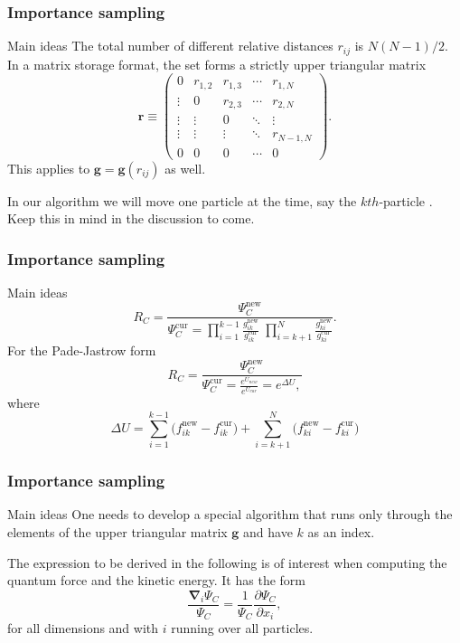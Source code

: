 \documentclass{beamer}
\begin{document}
\begin{frame}
\frametitle{Importance sampling}

\begin{block}{Main ideas }
The total number of different relative distances $r_{ij}$ is $N(N-1)/2$. In a matrix storage format, the set forms a strictly upper triangular matrix
\[
 \mathbf{r} \equiv \begin{pmatrix}
  0 & r_{1,2} & r_{1,3} & \cdots & r_{1,N} \\
  \vdots & 0       & r_{2,3} & \cdots & r_{2,N} \\
  \vdots & \vdots  & 0  & \ddots & \vdots  \\
  \vdots & \vdots  & \vdots  & \ddots  & r_{N-1,N} \\
  0 & 0  & 0  & \cdots  & 0
 \end{pmatrix}.
\]
This applies to  $\mathbf{g} = \mathbf{g}(r_{ij})$ as well. 

In our algorithm we will move one particle  at the time, say the $kth$-particle . Keep this in mind in the discussion to come.


\end{block}
\end{frame}

\begin{frame}
\frametitle{Importance sampling}

\begin{block}{Main ideas }
\[
R_{C} = \frac{\Psi_{C}^\mathrm{new}}{\Psi_{C}^\mathrm{cur} =
\prod_{i=1}^{k-1}\frac{g_{ik}^\mathrm{new}}{g_{ik}^\mathrm{cur}}\;
\prod_{i=k+1}^{N}\frac{g_{ki}^\mathrm{new}}{g_{ki}^\mathrm{cur}}}.
\]
For the Pade-Jastrow form
\[
 R_{C} = \frac{\Psi_{C}^\mathrm{new}}{\Psi_{C}^\mathrm{cur} = \frac{e^{U_{new}}}{e^{U_{cur}}} = e^{\Delta U},}
\]
where
\[
\Delta U =
\sum_{i=1}^{k-1}\big(f_{ik}^\mathrm{new}-f_{ik}^\mathrm{cur}\big)
+
\sum_{i=k+1}^{N}\big(f_{ki}^\mathrm{new}-f_{ki}^\mathrm{cur}\big)
\]

\end{block}
\end{frame}

\begin{frame}
\frametitle{Importance sampling}

\begin{block}{Main ideas }
One needs to develop a special algorithm 
that runs only through the elements of the upper triangular
matrix $\mathbf{g}$ and have $k$ as an index. 

The expression to be derived in the following is of interest when computing the quantum force and the kinetic energy. It has the form
\[
\frac{\mathbf{\nabla}_i\Psi_C}{\Psi_C} = \frac{1}{\Psi_C}\frac{\partial \Psi_C}{\partial x_i},
\]
for all dimensions and with $i$ running over all particles.
\end{block}
\end{frame}
\end{document}
